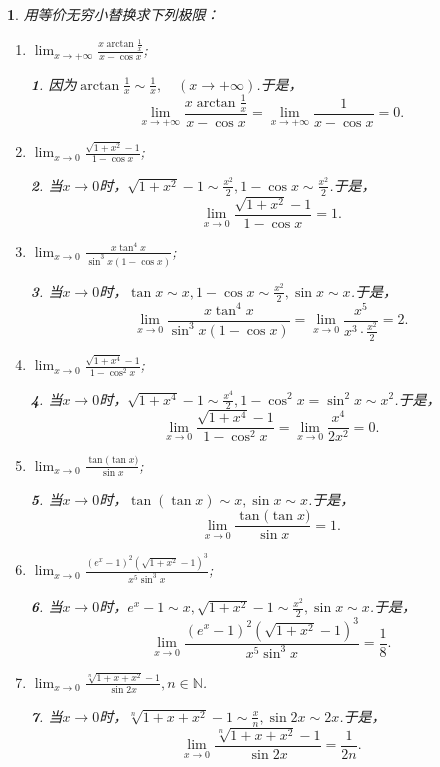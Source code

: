 \documentclass[utf8]{book}
\newtheorem{example}{}[section]             %
\newtheorem{solution}{}
\begin{document}
\begin{example}用等价无穷小替换求下列极限：
\renewcommand\labelenumi{\normalfont(\theenumi)}
\begin{enumerate}
\item $\displaystyle\lim_{x\to +\infty}\frac{x\arctan{\frac{1}{x}}}{x-\cos{x}}$;
\begin{solution}因为$\arctan{\frac{1}{x}}\sim \frac{1}{x}, \quad(x\to+\infty)$.于是，
$$\displaystyle\lim_{x\to +\infty}\frac{x\arctan{\frac{1}{x}}}{x-\cos{x}}=\displaystyle\lim_{x\to +\infty}\frac{1}{x-\cos{x}}=0.$$
\end{solution}
\item $\displaystyle\lim_{x\to 0}\frac{\sqrt{1+x^2}-1}{1-\cos{x}}$;
\begin{solution}当$x\to 0$时，$\sqrt{1+x^2}-1\sim\displaystyle\frac{x^2}{2}, 1-\cos{x}\sim\displaystyle\frac{x^2}{2}$.于是，
$$\displaystyle\lim_{x\to 0}\frac{\sqrt{1+x^2}-1}{1-\cos{x}}=1.$$
\end{solution}
\item $\displaystyle\lim_{x\to 0}\frac{x\tan^4{x}}{\sin^3{x}(1-\cos{x})}$;
\begin{solution}当$x\to 0$时，$\tan{x}\sim x, 1-\cos{x}\sim\displaystyle\frac{x^2}{2}, \sin{x} \sim x$.于是，
$$\displaystyle\lim_{x\to 0}\frac{x\tan^4{x}}{\sin^3{x}(1-\cos{x})}=\displaystyle\lim_{x\to 0}\frac{x^5}{x^3\cdot\frac{x^2}{2}}=2.$$
\end{solution}
\item $\displaystyle\lim_{x\to 0}\frac{\sqrt{1+x^4}-1}{1-\cos^2{x}}$;
\begin{solution}当$x\to 0$时，$\sqrt{1+x^4}-1\sim \frac{x^4}{2}, 1-\cos^2{x}=\sin^2{x}\sim x^2$.于是，
$$\displaystyle\lim_{x\to 0}\frac{\sqrt{1+x^4}-1}{1-\cos^2{x}}=\displaystyle\lim_{x\to 0}\frac{x^4}{2x^2}=0.$$
\end{solution}
\item $\displaystyle\lim_{x\to 0}\frac{\tan{(\tan{x}})}{\sin{x}}$;
\begin{solution}当$x\to 0$时，$\tan{(\tan{x})}\sim x, \sin{x}\sim x$.于是，
$$\displaystyle\lim_{x\to 0}\frac{\tan{(\tan{x}})}{\sin{x}}=1.$$
\end{solution}
\item $\displaystyle\lim_{x\to 0}\frac{(e^x-1)^2(\sqrt{1+x^2}-1)^3}{x^5\sin^3{x}}$;
\begin{solution}当$x\to 0$时，$e^x-1\sim x, \sqrt{1+x^2}-1\sim \frac{x^2}{2}, \sin{x}\sim x$.于是，
$$\displaystyle\lim_{x\to 0}\frac{(e^x-1)^2(\sqrt{1+x^2}-1)^3}{x^5\sin^3{x}}=\frac{1}{8}.$$
\end{solution}
\item $\displaystyle\lim_{x\to 0}\frac{\sqrt[n]{1+x+x^2}-1}{\sin{2x}},n\in\mathbb{N}$.
\begin{solution}当$x\to 0$时，$\sqrt[n]{1+x+x^2}-1\sim \frac{x}{n},  \sin{2x}\sim 2x$.于是，
$$\displaystyle\lim_{x\to 0}\frac{\sqrt[n]{1+x+x^2}-1}{\sin{2x}}=\frac{1}{2n}.$$
\end{solution}
\end{enumerate}
\end{example}
\end{document}
